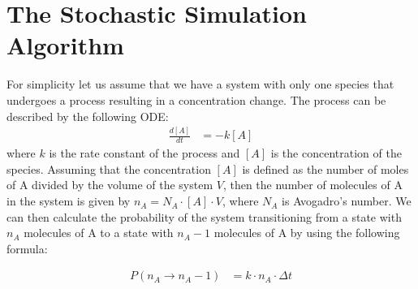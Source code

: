 \documentclass[12pt]{article}
\begin{document}
\section{The Stochastic Simulation Algorithm}
For simplicity let us assume that we have a system with only one species that undergoes a process resulting in a concentration change. The process can be described by the following ODE:
\begin{align}
\frac{d[A]}{dt} &= -k [A] 
\label{eq:ODE1}
\end{align}
where $k$ is the rate constant of the process and $[A]$ is the concentration of the species.  Assuming that the concentration $[A]$ is defined as the number of moles of A divided by the volume of the system $V$, then the number of molecules of A in the system is given by $n_A = N_A \cdot [A] \cdot V$, where $N_A$ is Avogadro's number. We can then calculate the probability of the system transitioning from a state with $n_A$ molecules of A to a state with $n_A-1$ molecules of A by using the following formula:

\begin{align}
P(n_A \rightarrow n_A-1) &= k \cdot n_A \cdot \Delta t
\label{eq:prob}
\end{align}
\end{document}
